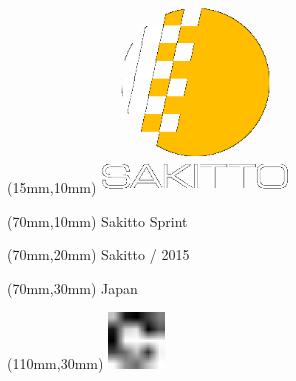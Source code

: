 \null\newpage
\begin{textblock*}{50mm}(15mm,10mm)%
\includegraphics[width=50mm]{LG/SAK.png}
\end{textblock*}
\begin{textblock*}{130mm}(70mm,10mm)%
{\fontsize{20}{20}\selectfont Sakitto Sprint}\\
\end{textblock*}
\begin{textblock*}{120mm}(70mm,20mm)%
{\fontsize{16}{16}\selectfont Sakitto / 2015}\\
\end{textblock*}
\begin{textblock*}{120mm}(70mm,30mm)%
{\fontsize{12}{12}\selectfont Japan}
\end{textblock*}
\begin{textblock*}{30mm}(110mm,30mm)%
\centering
\includegraphics[height=15mm]{icons/fa-rotate-right.pdf}
\end{textblock*}
